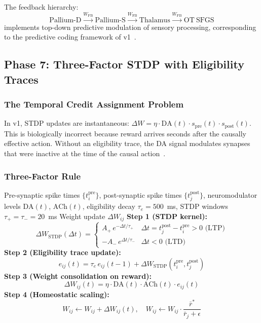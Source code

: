 \documentclass[11pt,a4paper]{article}
\begin{document}
The feedback hierarchy:
\[
  \mathrm{Pallium\text{-}D} \xrightarrow{W_\mathrm{FB}}
  \mathrm{Pallium\text{-}S}
  \xrightarrow{W_\mathrm{FB}}
  \mathrm{Thalamus}
  \xrightarrow{W_\mathrm{FB}}
  \mathrm{OT\ SFGS}
\]
implements top-down predictive modulation of sensory processing,
corresponding to the predictive coding framework of v1~\cite{rao1999}.

\subsection{Phase 7: Three-Factor STDP with Eligibility Traces}\label{sec:phase7}

\subsubsection{The Temporal Credit Assignment Problem}

In v1, STDP updates are instantaneous:
$\Delta W = \eta \cdot \mathrm{DA}(t) \cdot s_\mathrm{pre}(t) \cdot s_\mathrm{post}(t)$.
This is biologically incorrect because reward arrives seconds after the
causally effective action.
Without an eligibility trace, the DA signal modulates synapses that
were inactive at the time of the causal action~\cite{fremaux2016}.

\subsubsection{Three-Factor Rule}

\begin{algorithm}[H]
\caption{Three-Factor STDP with Eligibility Trace}
\label{alg:three_factor}
\begin{algorithmic}[1]
\REQUIRE Pre-synaptic spike times $\{t_i^\mathrm{pre}\}$,
  post-synaptic spike times $\{t_j^\mathrm{post}\}$,
  neuromodulator levels $\mathrm{DA}(t)$, $\mathrm{ACh}(t)$,
  eligibility decay $\tau_e = 500$~ms,
  STDP windows $\tau_+ = \tau_- = 20$~ms
\ENSURE Weight update $\Delta W_{ij}$
\STATE \textbf{Step 1 (STDP kernel):}
  \[
    \Delta W_\mathrm{STDP}(\Delta t) =
    \begin{cases}
      A_+\,e^{-\Delta t/\tau_+} & \Delta t = t_j^\mathrm{post} - t_i^\mathrm{pre} > 0 \text{ (LTP)} \\
      -A_-\,e^{\Delta t/\tau_-} & \Delta t < 0 \text{ (LTD)}
    \end{cases}
  \]
\STATE \textbf{Step 2 (Eligibility trace update):}
  \[
    e_{ij}(t) = \tau_e\,e_{ij}(t{-}1) + \Delta W_\mathrm{STDP}(t_i^\mathrm{pre}, t_j^\mathrm{post})
  \]
\STATE \textbf{Step 3 (Weight consolidation on reward):}
  \[
    \Delta W_{ij}(t) = \eta \cdot \mathrm{DA}(t) \cdot \mathrm{ACh}(t) \cdot e_{ij}(t)
  \]
\STATE \textbf{Step 4 (Homeostatic scaling):}
  \[
    W_{ij} \leftarrow W_{ij} + \Delta W_{ij}(t),
    \quad
    W_{ij} \leftarrow W_{ij} \cdot \frac{\bar{r}^*}{\bar{r}_j + \epsilon}
  \]
\end{algorithmic}
\end{algorithm}
\end{document}
